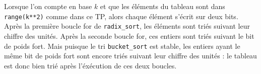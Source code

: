 Lorsque l'on compte en base $k$ et que les éléments du tableau sont dans 
\verb|range(k**2)| comme dans ce TP, alors chaque élément s'écrit sur deux 
bits. Après la première boucle for de \verb|radix_sort|, les éléments sont 
triés suivant leur chiffre des unités. Après la seconde boucle for, ces entiers 
sont triés suivant le bit de poids fort. Mais puisque le tri \verb|bucket_sort| 
est stable, les entiers ayant le même bit de poids fort sont encore triés 
suivant leur chiffre des unités : le tableau est donc bien trié après 
l'éxécution de ces deux boucles.

\else
\fi
